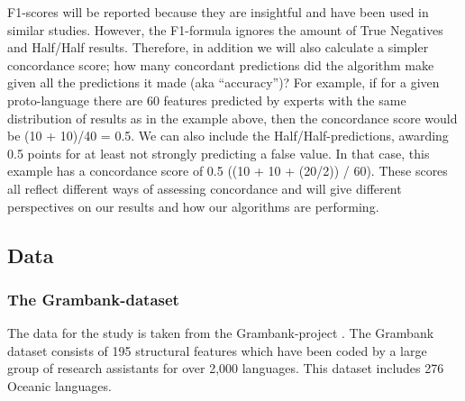 \documentclass[a4paper,10pt]{article} %
\begin{document}
F1-scores will be reported because they are insightful and have been used in similar studies. However, the F1-formula ignores the amount of True Negatives and Half/Half results. Therefore, in addition we will also calculate a simpler concordance score; how many concordant predictions did the algorithm make given all the predictions it made (aka ``accuracy'')? For example, if for a given proto-language there are 60 features predicted by experts with the same distribution of results as in the example above, then the concordance score would be (10 + 10)/40 = 0.5. We can also include the Half/Half-predictions, awarding 0.5 points for at least not strongly predicting a false value. In that case, this example has a concordance score of 0.5 ((10 + 10 + (20/2)) / 60). These scores all reflect different ways of assessing concordance and will give different perspectives on our results and how our algorithms are performing. %

\subsection{Data}

\subsubsection{The Grambank-dataset}
\label{asr:sec:GBcoverage}

The data for the study is taken from the Grambank-project \citep{grambankwebsite}. The Grambank dataset consists of 195 structural features which have been coded by a large group of research assistants for over 2,000 languages. This dataset includes 276 Oceanic languages. 

\end{document}
